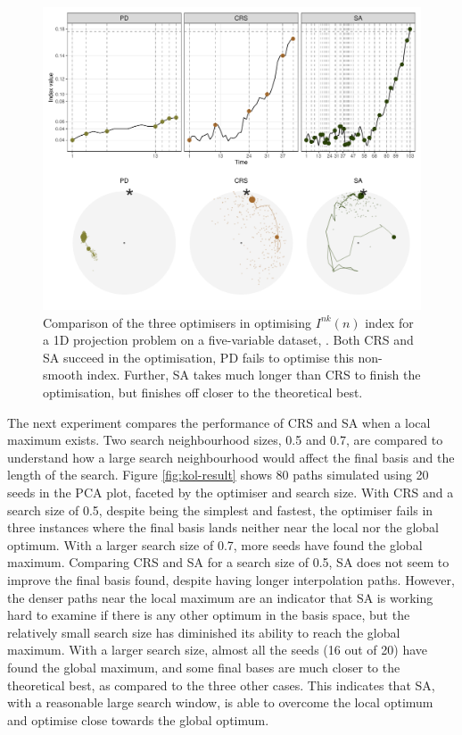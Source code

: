 \begin{Schunk}
\begin{figure}

{\centering \includegraphics[width=1\linewidth]{figs/noisy-better-geo} 

}

\caption[Comparison of the three optimisers in optimising $I^{nk}(n)$ index for a 1D projection problem on a five-variable dataset, ]{Comparison of the three optimisers in optimising $I^{nk}(n)$ index for a 1D projection problem on a five-variable dataset, . Both CRS and SA succeed in the optimisation, PD fails to optimise this non-smooth index. Further, SA takes  much longer than CRS to finish the optimisation, but finishes off closer to the theoretical best.}\label{fig:noisy-better-geo}
\end{figure}
\end{Schunk}

The next experiment compares the performance of CRS and SA when a local
maximum exists. Two search neighbourhood sizes, 0.5 and 0.7, are
compared to understand how a large search neighbourhood would affect the
final basis and the length of the search. Figure \ref{fig:kol-result}
shows 80 paths simulated using 20 seeds in the PCA plot, faceted by the
optimiser and search size. With CRS and a search size of 0.5, despite
being the simplest and fastest, the optimiser fails in three instances
where the final basis lands neither near the local nor the global
optimum. With a larger search size of 0.7, more seeds have found the
global maximum. Comparing CRS and SA for a search size of 0.5, SA does
not seem to improve the final basis found, despite having longer
interpolation paths. However, the denser paths near the local maximum
are an indicator that SA is working hard to examine if there is any
other optimum in the basis space, but the relatively small search size
has diminished its ability to reach the global maximum. With a larger
search size, almost all the seeds (16 out of 20) have found the global
maximum, and some final bases are much closer to the theoretical best,
as compared to the three other cases. This indicates that SA, with a
reasonable large search window, is able to overcome the local optimum
and optimise close towards the global optimum.

